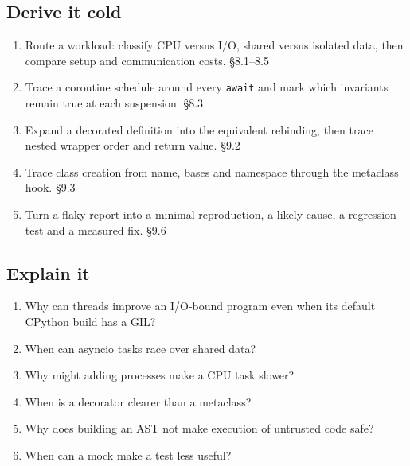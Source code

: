 \documentclass[11pt]{article}
\begin{document}
\begin{keepsection}
\section{Derive it cold}

\begin{enumerate}
\item Route a workload: classify CPU versus I/O, shared versus isolated data, then compare setup and communication costs. \hfill{\small\color{FAUblue}§8.1–8.5}
\item Trace a coroutine schedule around every \texttt{await} and mark which invariants remain true at each suspension. \hfill{\small\color{FAUblue}§8.3}
\item Expand a decorated definition into the equivalent rebinding, then trace nested wrapper order and return value. \hfill{\small\color{FAUblue}§9.2}
\item Trace class creation from name, bases and namespace through the metaclass hook. \hfill{\small\color{FAUblue}§9.3}
\item Turn a flaky report into a minimal reproduction, a likely cause, a regression test and a measured fix. \hfill{\small\color{FAUblue}§9.6}
\end{enumerate}
\end{keepsection}

\begin{keepsection}
\section{Explain it}

\begin{enumerate}
\item Why can threads improve an I/O-bound program even when its default CPython build has a GIL?
\item When can asyncio tasks race over shared data?
\item Why might adding processes make a CPU task slower?
\item When is a decorator clearer than a metaclass?
\item Why does building an AST not make execution of untrusted code safe?
\item When can a mock make a test less useful?
\end{enumerate}

\end{keepsection}
\end{document}
